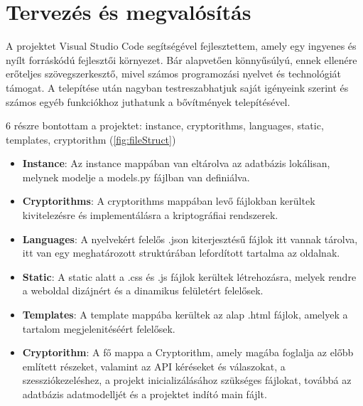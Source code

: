 \chapter{Tervezés és megvalósítás}

A projektet Visual Studio Code segítségével fejlesztettem, amely egy ingyenes és nyílt forráskódú fejlesztői környezet. Bár alapvetően könnyűsúlyú, ennek ellenére erőteljes szövegszerkesztő, mivel számos programozási nyelvet és technológiát támogat. A telepítése után nagyban testreszabhatjuk saját igényeink szerint és számos egyéb funkciókhoz juthatunk a bővítmények telepítésével.

6 részre bontottam a projektet: instance, cryptorithms, languages, static, templates, cryptorithm  (\ref{fig:fileStruct})

\begin{itemize}
	\item\textbf{Instance}:
Az instance mappában van eltárolva az adatbázis lokálisan, melynek modelje a models.py fájlban van definiálva.

	\item\textbf{Cryptorithms}:
A cryptorithms mappában levő fájlokban kerültek kivitelezésre és implementálásra a kriptográfiai rendszerek.

	\item\textbf{Languages}:
A nyelvekért felelős .json kiterjesztésű fájlok itt vannak tárolva, itt van egy meghatározott struktúrában lefordított tartalma az oldalnak.

	\item\textbf{Static}:
A static alatt a .css és .js fájlok kerültek létrehozásra, melyek rendre a weboldal dizájnért és a dinamikus felületért felelősek.

	\item\textbf{Templates}:
A template mappába kerültek az alap .html fájlok, amelyek a tartalom megjelenitéséért felelősek.

	\item\textbf{Cryptorithm}:
A fő mappa a Cryptorithm, amely magába foglalja az előbb említett részeket, valamint az API kéréseket és válaszokat, a szessziókezeléshez, a projekt inicializálásához szükséges fájlokat, továbbá az adatbázis adatmodelljét és a projektet indító main fájlt.

\end{itemize}

